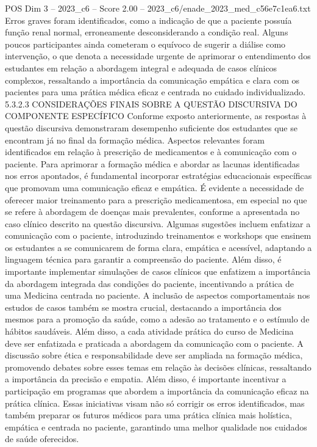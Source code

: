 \begin{textsample}{POS Dim 3 – 2023\_c6 – Score 2.00 – 2023\_c6/enade\_2023\_med\_c56e7c1ea6.txt}
Erros graves foram identificados, como a indicação de que a paciente possuía função renal normal, erroneamente desconsiderando a condição real.
Alguns poucos participantes ainda cometeram o equívoco de sugerir a diálise como intervenção, o que denota a necessidade urgente de aprimorar o entendimento dos estudantes em relação a abordagem integral e adequada de casos clínicos complexos, ressaltando a importância da comunicação empática e clara com os pacientes para uma prática médica eficaz e centrada no cuidado individualizado. 5.3.2.3 CONSIDERAÇÕES FINAIS SOBRE A QUESTÃO DISCURSIVA DO COMPONENTE ESPECÍFICO Conforme exposto anteriormente, as respostas à questão discursiva demonstraram desempenho suficiente dos estudantes que se encontram já no final da formação médica.
Aspectos relevantes foram identificados em relação à prescrição de medicamentos e à comunicação com o paciente.
Para aprimorar a formação médica e abordar as lacunas identificadas nos erros apontados, é fundamental incorporar estratégias educacionais específicas que promovam uma comunicação eficaz e empática.
É evidente a necessidade de oferecer maior treinamento para a prescrição medicamentosa, em especial no que se refere à abordagem de doenças mais prevalentes, conforme a apresentada no caso clínico descrito na questão discursiva.
Algumas sugestões incluem enfatizar a comunicação com o paciente, introduzindo treinamentos e workshops que ensinem os estudantes a se comunicarem de forma clara, empática e acessível, adaptando a linguagem técnica para garantir a compreensão do paciente.
Além disso, é importante implementar simulações de casos clínicos que enfatizem a importância da abordagem integrada das condições do paciente, incentivando a prática de uma Medicina centrada no paciente.
A inclusão de aspectos comportamentais nos estudos de casos também se mostra crucial, destacando a importância dos mesmos para a promoção da saúde, como a adesão ao tratamento e o estímulo de hábitos saudáveis.
Além disso, a cada atividade prática do curso de Medicina deve ser enfatizada e praticada a abordagem da comunicação com o paciente.
A discussão sobre ética e responsabilidade deve ser ampliada na formação médica, promovendo debates sobre esses temas em relação às decisões clínicas, ressaltando a importância da precisão e empatia.
Além disso, é importante incentivar a participação em programas que abordem a importância da comunicação eficaz na prática clínica.
Essas iniciativas visam não só corrigir os erros identificados, mas também preparar os futuros médicos para uma prática clínica mais holística, empática e centrada no paciente, garantindo uma melhor qualidade nos cuidados de saúde oferecidos.

\end{textsample}
